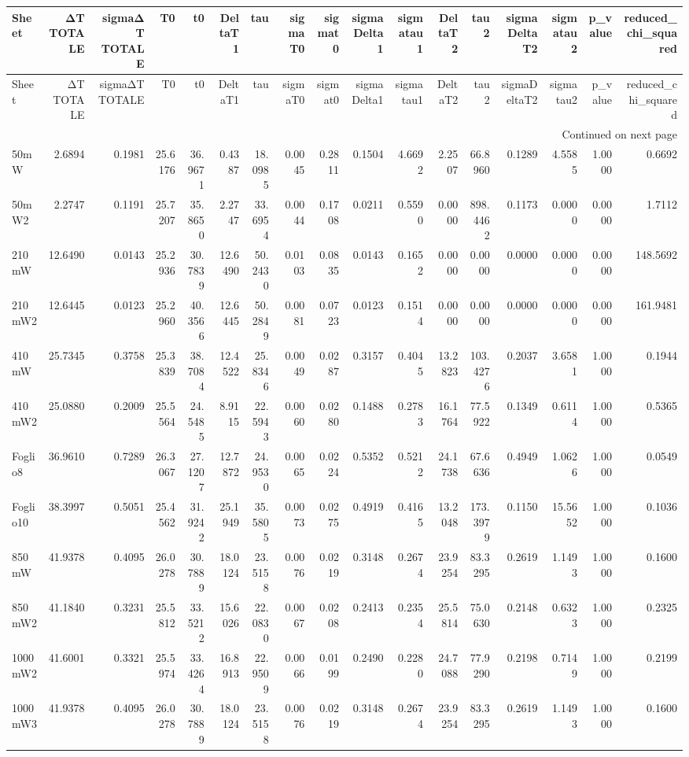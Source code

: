 \begin{longtable}{lrrrrrrrrrrrrrrrr}
\toprule
Sheet & ΔT TOTALE & sigmaΔT TOTALE & T0 & t0 & DeltaT1 & tau & sigmaT0 & sigmat0 & sigmaDelta1 & sigmatau1 & DeltaT2 & tau2 & sigmaDeltaT2 & sigmatau2 & p_value & reduced_chi_squared \\
\midrule
\endfirsthead
\toprule
Sheet & ΔT TOTALE & sigmaΔT TOTALE & T0 & t0 & DeltaT1 & tau & sigmaT0 & sigmat0 & sigmaDelta1 & sigmatau1 & DeltaT2 & tau2 & sigmaDeltaT2 & sigmatau2 & p_value & reduced_chi_squared \\
\midrule
\endhead
\midrule
\multicolumn{17}{r}{Continued on next page} \\
\midrule
\endfoot
\bottomrule
\endlastfoot
50mW & 2.6894 & 0.1981 & 25.6176 & 36.9671 & 0.4387 & 18.0985 & 0.0045 & 0.2811 & 0.1504 & 4.6692 & 2.2507 & 66.8960 & 0.1289 & 4.5585 & 1.0000 & 0.6692 \\
50mW2 & 2.2747 & 0.1191 & 25.7207 & 35.8650 & 2.2747 & 33.6954 & 0.0044 & 0.1708 & 0.0211 & 0.5590 & 0.0000 & 898.4462 & 0.1173 & 0.0000 & 0.0000 & 1.7112 \\
210mW & 12.6490 & 0.0143 & 25.2936 & 30.7839 & 12.6490 & 50.2430 & 0.0103 & 0.0835 & 0.0143 & 0.1652 & 0.0000 & 0.0000 & 0.0000 & 0.0000 & 0.0000 & 148.5692 \\
210mW2 & 12.6445 & 0.0123 & 25.2960 & 40.3566 & 12.6445 & 50.2849 & 0.0081 & 0.0723 & 0.0123 & 0.1514 & 0.0000 & 0.0000 & 0.0000 & 0.0000 & 0.0000 & 161.9481 \\
410mW & 25.7345 & 0.3758 & 25.3839 & 38.7084 & 12.4522 & 25.8346 & 0.0049 & 0.0287 & 0.3157 & 0.4045 & 13.2823 & 103.4276 & 0.2037 & 3.6581 & 1.0000 & 0.1944 \\
410mW2 & 25.0880 & 0.2009 & 25.5564 & 24.5485 & 8.9115 & 22.5943 & 0.0060 & 0.0280 & 0.1488 & 0.2783 & 16.1764 & 77.5922 & 0.1349 & 0.6114 & 1.0000 & 0.5365 \\
Foglio8 & 36.9610 & 0.7289 & 26.3067 & 27.1207 & 12.7872 & 24.9530 & 0.0065 & 0.0224 & 0.5352 & 0.5212 & 24.1738 & 67.6636 & 0.4949 & 1.0626 & 1.0000 & 0.0549 \\
Foglio10 & 38.3997 & 0.5051 & 25.4562 & 31.9242 & 25.1949 & 35.5805 & 0.0073 & 0.0275 & 0.4919 & 0.4165 & 13.2048 & 173.3979 & 0.1150 & 15.5652 & 1.0000 & 0.1036 \\
850mW & 41.9378 & 0.4095 & 26.0278 & 30.7889 & 18.0124 & 23.5158 & 0.0076 & 0.0219 & 0.3148 & 0.2674 & 23.9254 & 83.3295 & 0.2619 & 1.1493 & 1.0000 & 0.1600 \\
850mW2 & 41.1840 & 0.3231 & 25.5812 & 33.5212 & 15.6026 & 22.0830 & 0.0067 & 0.0208 & 0.2413 & 0.2354 & 25.5814 & 75.0630 & 0.2148 & 0.6323 & 1.0000 & 0.2325 \\
1000mW2 & 41.6001 & 0.3321 & 25.5974 & 33.4264 & 16.8913 & 22.9509 & 0.0066 & 0.0199 & 0.2490 & 0.2280 & 24.7088 & 77.9290 & 0.2198 & 0.7149 & 1.0000 & 0.2199 \\
1000mW3 & 41.9378 & 0.4095 & 26.0278 & 30.7889 & 18.0124 & 23.5158 & 0.0076 & 0.0219 & 0.3148 & 0.2674 & 23.9254 & 83.3295 & 0.2619 & 1.1493 & 1.0000 & 0.1600 \\
\end{longtable}
